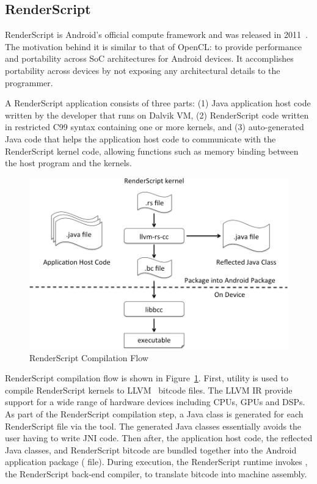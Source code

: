 
\subsection{RenderScript}
RenderScript is Android's official compute framework and was released in 
2011~\cite{RenderScript}. The motivation behind it is similar to that of OpenCL: to provide
performance and portability across SoC architectures for Android devices.
It accomplishes portability across devices by not exposing any architectural details to the programmer.

A RenderScript application consists of three parts: (1) Java application host
code written by the developer that runs on Dalvik VM, (2) RenderScript code
written in restricted C99 syntax containing one or more kernels, and (3)
auto-generated Java code that helps the application host code to communicate with
the RenderScript kernel code, allowing functions such as memory binding between the
host program and the kernels.

\begin{figure}
\centering
\includegraphics[scale=0.28]{figs/renderscript-compile.png}
\caption{RenderScript Compilation Flow}
\label{fig:RSCompilation}
\centering
\end{figure}

RenderScript compilation flow is shown in Figure~\ref{fig:RSCompilation}.
First,  utility is used to compile RenderScript kernels to
LLVM~\cite{LLVM:CGO04} bitcode files. The LLVM IR provide support for a wide range of hardware
devices including CPUs, GPUs and DSPs. 
As part of the RenderScript compilation step, a Java class
is generated for each RenderScript file via the  tool.
The generated Java classes essentially avoids the user having to write JNI code.
Then after, the application host code, the reflected Java classes, and RenderScript bitcode
are bundled together into the Android application package ( file).
During execution, the RenderScript
runtime invokes , the RenderScript back-end compiler, to translate
bitcode into machine assembly.


